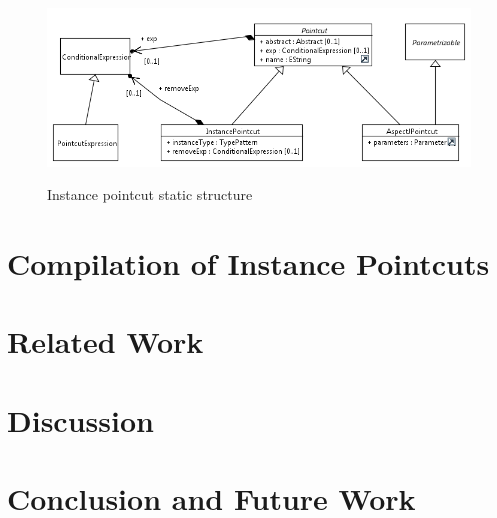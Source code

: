 \documentclass{llncs}
\begin{document}
\begin{figure}
\centering
   \includegraphics[width=\textwidth] {images/pc.png}
   \label{fig:shapes}
\label{fig:ip}
\caption{Instance pointcut static structure}
\end{figure}



\section{Compilation of Instance Pointcuts}

\section{Related Work}
\section{Discussion}
\section{Conclusion and Future Work}
\end{document}
